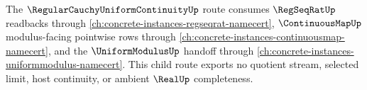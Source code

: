 The $\RegularCauchyUniformContinuityUp$ route consumes $\RegSeqRatUp$ readbacks through \autoref{ch:concrete-instances-regseqrat-namecert}, $\ContinuousMapUp$ modulus-facing pointwise rows through \autoref{ch:concrete-instances-continuousmap-namecert}, and the $\UniformModulusUp$ handoff through \autoref{ch:concrete-instances-uniformmodulus-namecert}. This child route exports no quotient stream, selected limit, host continuity, or ambient $\RealUp$ completeness.
